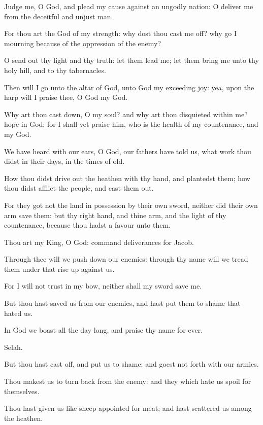 \Chapter
\Verse Judge me, O God, and plead my cause against an ungodly nation: O deliver me from the deceitful and unjust man.

\Verse For thou art the God of my strength: why dost thou cast me off?  why go I mourning because of the oppression of the enemy?

\Verse O send out thy light and thy truth: let them lead me; let them bring me unto thy holy hill, and to thy tabernacles.

\Verse Then will I go unto the altar of God, unto God my exceeding joy: yea, upon the harp will I praise thee, O God my God.

\Verse Why art thou cast down, O my soul? and why art thou disquieted within me? hope in God: for I shall yet praise him, who is the health of my countenance, and my God.




\Chapter
\Verse We have heard with our ears, O God, our fathers have told us, what work thou didst in their days, in the times of old.

\Verse How thou didst drive out the heathen with thy hand, and plantedst them; how thou didst afflict the people, and cast them out.

\Verse For they got not the land in possession by their own sword, neither did their own arm save them: but thy right hand, and thine arm, and the light of thy countenance, because thou hadst a favour unto them.

\Verse Thou art my King, O God: command deliverances for Jacob.

\Verse Through thee will we push down our enemies: through thy name will we tread them under that rise up against us.

\Verse For I will not trust in my bow, neither shall my sword save me.

\Verse But thou hast saved us from our enemies, and hast put them to shame that hated us.

\Verse In God we boast all the day long, and praise thy name for ever.

Selah.

\Verse But thou hast cast off, and put us to shame; and goest not forth with our armies.

\Verse Thou makest us to turn back from the enemy: and they which hate us spoil for themselves.

\Verse Thou hast given us like sheep appointed for meat; and hast scattered us among the heathen.

